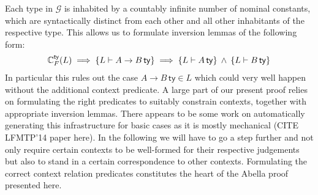 \documentclass[a4paper,UKenglish]{lipics-v2016}
\newcommand{\ms}{\,}
\newcommand{\mrel}[1]{\mathrel{\ms #1 \ms}}
\newcommand{\mAnd}{\mrel{\wedge}}
\newcommand{\istyFh}[1]{\ensuremath{#1\ms\mathsf{ty}}}
\theoremstyle{plain}
\begin{document}
Each type in $\mathcal{G}$ is inhabited by a countably infinite number of nominal constants, which are syntactically distinct from each other and all other inhabitants of the respective type.
This allows us to formulate inversion lemmas of the following form:
\begin{align*}
  \acFty{L} \implies \{L \vdash \istyFh{A \to B}\} \implies \{L \vdash \istyFh{A}\} \mAnd \{L \vdash \istyFh{B}\}
\end{align*}
In particular this rules out the case $\istyFh{A \to B} \in L$ which could very well happen without the additional context predicate.
A large part of our present proof relies on formulating the right predicates to suitably constrain contexts, together with appropriate inversion lemmas.
There appears to be some work on automatically generating this infrastructure for basic cases as it is mostly mechanical (CITE LFMTP'14 paper here).
In the following we will have to go a step further and not only require certain contexts to be well-formed for their respective judgements but also to stand in a certain correspondence to other contexts.
Formulating the correct context relation predicates constitutes the heart of the Abella proof presented here.
\end{document}
